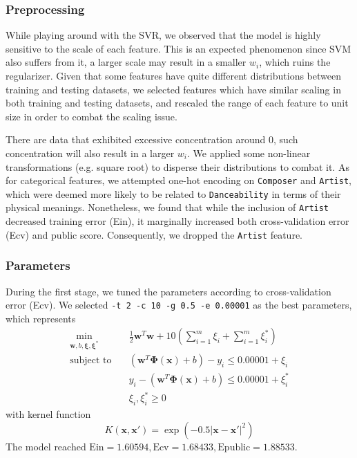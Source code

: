 \documentclass[10pt,letterpaper]{article}
\begin{document}
\subsubsection{Preprocessing}

While playing around with the SVR, we observed that the model is highly sensitive to the scale of each feature. This is an expected phenomenon since SVM also suffers from it, a larger scale may result in a smaller $w_i$, which ruins the regularizer. Given that some features have quite different distributions between training and testing datasets, we selected features which have similar scaling in both training and testing datasets, and rescaled the range of each feature to unit size in order to combat the scaling issue. 

There are data that exhibited excessive concentration around $0$, such concentration will also result in a larger $w_i$. We applied some non-linear transformations (e.g. square root) to disperse their distributions to combat it. As for categorical features, we attempted one-hot encoding on \texttt{Composer} and \texttt{Artist}, which were deemed more likely to be related to \texttt{Danceability} in terms of their physical meanings. Nonetheless, we found that while the inclusion of \texttt{Artist} decreased training error (Ein), it marginally increased both cross-validation error (Ecv) and public score. Consequently, we dropped the \texttt{Artist} feature.

\subsubsection{Parameters}

During the first stage, we tuned the parameters according to cross-validation error (Ecv). We selected \texttt{-t 2 -c 10 -g 0.5 -e 0.00001} as the best parameters, which represents 
\begin{align*}
	\underset{\mathbf{w}, b, \mathbf{\xi}, \mathbf{\xi^*}}{\min} \quad & \frac{1}{2}\mathbf{w}^T\mathbf{w} + 10\left(\sum_{i=1}^m \xi_i + \sum_{i=1}^m \xi^*_i\right) \\
	\text{subject to} \quad & (\mathbf{w}^T \mathbf{\Phi(x)} + b) - y_i \le 0.00001 + \xi_i \\
	& y_i - (\mathbf{w}^T \mathbf{\Phi(x)} + b) \le 0.00001 + \xi^*_i \\
	& \xi_i, \xi^*_i \ge 0
\end{align*}
with kernel function
$$
	K(\mathbf{x}, \mathbf{x'}) = \exp(-0.5 \lvert \mathbf{x} - \mathbf{x'}\rvert^2)
$$
The model reached $\text{Ein} = 1.60594, \text{Ecv} = 1.68433, \text{Epublic} = 1.88533$. 
\end{document}

